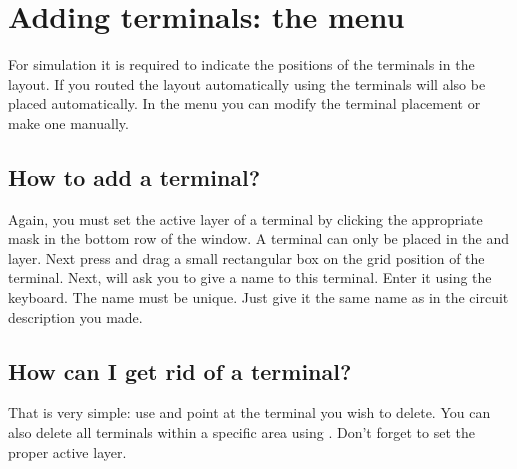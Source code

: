 
\section{Adding terminals: the \protect{} menu}
For simulation it is required to indicate the positions of the
terminals in the layout. If you routed the layout automatically using
 the terminals will also be placed automatically.  In the
menu  you can modify the terminal placement or make
one manually.

\subsection{How to add a terminal?}
Again, you must set the active layer of a terminal by clicking the
appropriate mask in the bottom row of the window. A terminal can only
be placed in the  and  layer.  Next press
 and drag a small rectangular box on the grid
position of the terminal. Next,  will ask you to give a
name to this terminal. Enter it using the keyboard. The name must be
unique. Just give it the same name as in the circuit description you
made.

\subsection{How can I get rid of a terminal?}
That is very simple: use  and point at the terminal you
wish to delete. You can also delete all terminals within a specific area using
. Don't forget to set the proper active layer.

